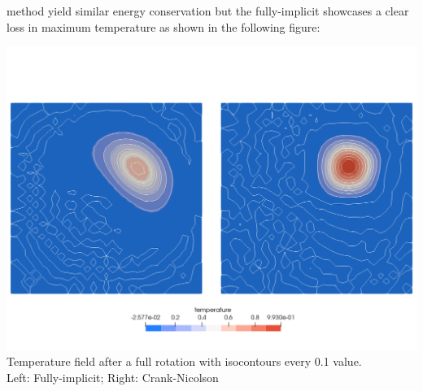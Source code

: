 method yield similar energy conservation but the fully-implicit showcases a clear loss in maximum temperature as shown in the following figure:
\begin{center}
\includegraphics[width=15cm]{python_codes/fieldstone_43/images/temp}\\
{\small Temperature field after a full rotation with isocontours every 0.1 value.\\ Left: Fully-implicit; Right: Crank-Nicolson}
\end{center}

